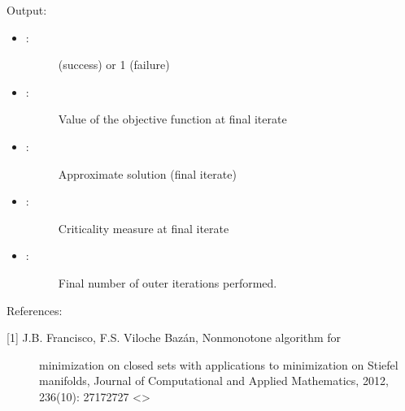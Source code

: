 \documentclass[a4paper,10pt,english]{sphinxmanual}
\begin{document}
\begin{fulllineitems}
\begin{itemize}
\begin{description}
\begin{description}
\begin{itemize}
\begin{description}
\end{description}

\end{itemize}

\end{description}

\end{description}

\end{itemize}

Output:
\begin{itemize}
\item {} \begin{description}
\item[{: }]  (success) or 1 (failure)

\end{description}

\item {} \begin{description}
\item[{: }] \leavevmode
Value of the objective function at final iterate

\end{description}

\item {} \begin{description}
\item[{: }] \leavevmode
Approximate solution (final iterate)

\end{description}

\item {} \begin{description}
\item[{: }] \leavevmode
Criticality measure at final iterate

\end{description}

\item {} \begin{description}
\item[{: }] \leavevmode
Final number of outer iterations performed.

\end{description}

\end{itemize}

References:
\begin{description}
\item[{{[}1{]} J.B. Francisco, F.S. Viloche Bazán, Nonmonotone algorithm for }] \leavevmode
minimization on closed sets with applications to minimization on 
Stiefel manifolds, Journal of Computational and Applied Mathematics, 
2012, 236(10): 2717\textendash{}2727 \textless{}\textgreater{}


\end{description}
\end{fulllineitems}
\end{document}
